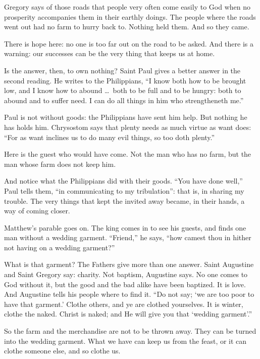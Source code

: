 Gregory says of those roads that people very often come easily to God when no
prosperity accompanies them in their earthly doings. The people where the roads
went out had no farm to hurry back to. Nothing held them. And so they came.

There is hope here: no one is too far out on the road to be asked. And there
is a warning: our successes can be the very thing that keeps us at home.

\bigskip

Is the answer, then, to own nothing? Saint Paul gives a better answer in the
second reading. He writes to the Philippians, ``I know both how to be brought
low, and I know how to abound \ldots\ both to be full and to be hungry: both
to abound and to suffer need. I can do all things in him who strengtheneth
me.''

Paul is not without goods: the Philippians have sent him help. But nothing he
has holds him. Chrysostom says that plenty needs as much virtue as want does:
``For as want inclines us to do many evil things, so too doth plenty.''

Here is the guest who would have come. Not the man who has no farm, but the
man whose farm does not keep him.

And notice what the Philippians did with their goods. ``You have done well,''
Paul tells them, ``in communicating to my tribulation'': that is, in sharing
my trouble. The very things that kept the invited away became, in their hands,
a way of coming closer.

\bigskip

Matthew's parable goes on. The king comes in to see his guests, and finds one
man without a wedding garment. ``Friend,'' he says, ``how camest thou in
hither not having on a wedding garment?''

What is that garment? The Fathers give more than one answer. Saint Augustine
and Saint Gregory say: charity. Not baptism, Augustine says. No one comes to
God without it, but the good and the bad alike have been baptized. It is love. And Augustine tells his
people where to find it. ``Do not say; `we are too poor to have that garment.'
Clothe others, and ye are clothed yourselves. It is winter, clothe the naked.
Christ is naked; and He will give you that `wedding garment'.''

So the farm and the merchandise are not to be thrown away. They can be turned
into the wedding garment. What we have can keep us from the feast, or it can
clothe someone else, and so clothe us.

